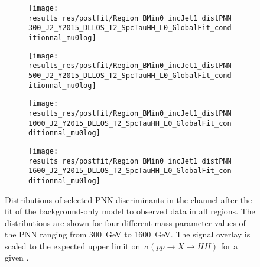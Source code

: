 \begin{figure}[htbp]
  \centering

  \begin{subfigure}{0.495\textwidth}
    \centering

    \texttt{[image: results\_res/postfit/Region\_BMin0\_incJet1\_distPNN300\_J2\_Y2015\_DLLOS\_T2\_SpcTauHH\_L0\_GlobalFit\_conditionnal\_mu0log]}
  \end{subfigure}\hfill%
  \begin{subfigure}{0.495\textwidth}
    \centering

    \texttt{[image: results\_res/postfit/Region\_BMin0\_incJet1\_distPNN500\_J2\_Y2015\_DLLOS\_T2\_SpcTauHH\_L0\_GlobalFit\_conditionnal\_mu0log]}
  \end{subfigure}

  \begin{subfigure}{0.495\textwidth}
    \centering

    \texttt{[image: results\_res/postfit/Region\_BMin0\_incJet1\_distPNN1000\_J2\_Y2015\_DLLOS\_T2\_SpcTauHH\_L0\_GlobalFit\_conditionnal\_mu0log]}
    \label{fig:pnn1000_postfit}
  \end{subfigure}\hfill%
  \begin{subfigure}{0.495\textwidth}
    \centering

    \texttt{[image: results\_res/postfit/Region\_BMin0\_incJet1\_distPNN1600\_J2\_Y2015\_DLLOS\_T2\_SpcTauHH\_L0\_GlobalFit\_conditionnal\_mu0log]}
  \end{subfigure}

  \caption[Distributions of selected PNN discriminants in the \hadhad channel
  after the background-only fit.]{Distributions of selected PNN discriminants in
    the \hadhad channel after the fit of the background-only model to observed
    data in all regions. The distributions are shown for four different mass
    parameter values of the PNN ranging from \SI{300}{\GeV} to
    \SI{1600}{\GeV}. The signal overlay is scaled to the expected upper limit
    on~$\sigma(pp \to X \to HH)$ for a given \mX.}%
  \label{fig:resonant_mva_postfit}
\end{figure}


\begin{table}[htbp]
  \centering

  \caption[Expected and observed number of events in the \hadhad~SR for
  signal-like bins of the PNN discriminant after the background-only
  fit.]{Expected and observed number of events in the \hadhad~SR for signal-like
    bins of the PNN discriminant after a fit of the background-only fit model to
    observed data in all regions. The two most signal-like bins are shown for
    $\mX = \SI{300}{\GeV}$ and \SI{500}{\GeV}. $\dagger$:~Only the most
    signal-like bin is shown for $\mX = \SI{1000}{\GeV}$ and \SI{1600}{\GeV}.}%
  \label{tab:yields_postfit_resonant}

  \resizebox{\textwidth}{!}{%

    
  }
\end{table}

